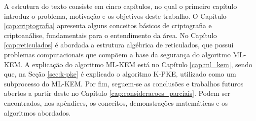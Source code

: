 A estrutura do texto consiste em cinco capítulos, no qual o primeiro capítulo introduz o problema, motivação e os objetivos deste trabalho. O Capítulo \ref{cap:criptografia} apresenta alguns conceitos básicos de criptografia e criptoanálise, fundamentais para o entendimento da área. No Capítulo \ref{cap:reticulados} é abordada a estrutura algébrica de reticulados, que possui problemas computacionais que compõem a base da segurança do algoritmo \ac{ML-KEM}. A explicação do algoritmo \ac{ML-KEM} está no Capítulo \ref{cap:ml_kem}, sendo que, na Seção \ref{sec:k-pke} é explicado o algoritmo K-PKE, utilizado como um subprocesso do \ac{ML-KEM}. Por fim, seguem-se as conclusões e trabalhos futuros abertos a partir deste no Capítulo \ref{cap:consideracoes_parciais}. Podem ser encontrados, nos apêndices, os conceitos, demonstrações matemáticas e os algoritmos abordados.